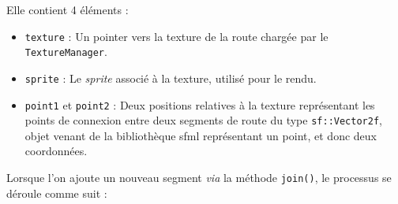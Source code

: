 Elle contient 4 éléments :
\begin{itemize}
    \item \texttt{texture} : Un \gls{pointer} vers la texture de la route chargée par le \texttt{TextureManager}.
    \item \texttt{sprite} : Le \textit{\gls{sprite}} associé à la texture, utilisé pour le rendu.
    \item \texttt{point1} et \texttt{point2} : Deux positions relatives à la texture représentant les points de connexion entre deux segments de route du type \texttt{sf::Vector2f}, objet venant de la bibliothèque \gls{sfml} représentant un point, et donc deux coordonnées.
\end{itemize}

Lorsque l'on ajoute un nouveau segment \textit{via} la méthode \texttt{join()}, le processus se déroule comme suit :

